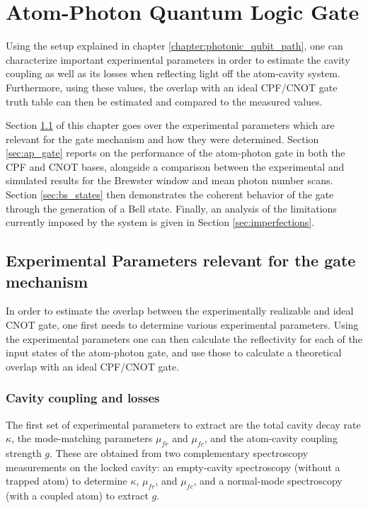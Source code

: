 \chapter{Atom-Photon Quantum Logic Gate}

Using the setup explained in chapter \ref{chapter:photonic_qubit_path}, one can characterize important experimental parameters in order to estimate the cavity coupling as well as its losses when reflecting light off the atom-cavity system. Furthermore, using these values, the overlap with an ideal CPF/CNOT gate truth table can then be estimated and compared to the measured values.

Section \ref{section:experimental_parameters_for_gate} of this chapter goes over the experimental parameters which are relevant for the gate mechanism and how they were determined. Section \ref{sec:ap_gate} reports on the performance of the atom-photon gate in both the CPF and CNOT bases, alongside a comparison between the experimental and simulated results for the Brewster window and mean photon number scans. Section \ref{sec:bs_states} then demonstrates the coherent behavior of the gate through the generation of a Bell state. Finally, an analysis of the limitations currently imposed by the system is given in Section \ref{sec:imperfections}.

\section{Experimental Parameters relevant for the gate mechanism} \label{section:experimental_parameters_for_gate}

In order to estimate the overlap between the experimentally realizable and ideal CNOT gate, one first needs to determine various experimental parameters. Using the experimental parameters one can then calculate the reflectivity for each of the input states of the atom-photon gate, and use those to calculate a theoretical overlap with an ideal CPF/CNOT gate.

\subsection{Cavity coupling and losses} \label{sec:cav_coupling}

The first set of experimental parameters to extract are the total cavity decay rate $\kappa$, the mode-matching parameters $\mu_{fr}$ and $\mu_{fc}$, and the atom-cavity coupling strength $g$. These are obtained from two complementary spectroscopy measurements on the locked cavity: an empty-cavity spectroscopy (without a trapped atom) to determine $\kappa$, $\mu_{fr}$, and $\mu_{fc}$, and a normal-mode spectroscopy (with a coupled atom) to extract $g$.


